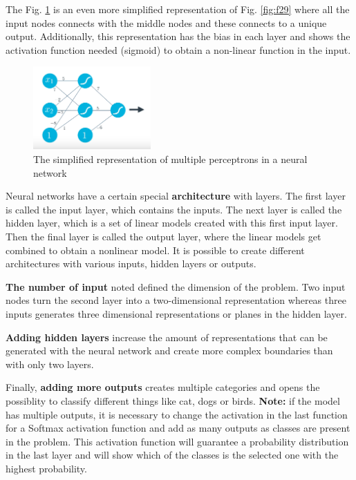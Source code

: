 \documentclass{article}
\begin{document}
The Fig. \ref{fig:f30} is an even more simplified representation of Fig. \ref{fig:f29} where all the input nodes connects with the middle nodes and these connects to a unique output. Additionally, this representation has the bias in each layer and shows the activation function needed (sigmoid) to obtain a non-linear function in the input.

\begin{figure}[ht]
    \centering
    \includegraphics[width=0.4\textwidth,height=0.4\textheight,keepaspectratio]{images/adding_perceptrons_3.png}
    \captionsetup{justification=centering}
    \caption{The simplified representation of multiple perceptrons in a neural network}
    \label{fig:f30}
\end{figure}

Neural networks have a certain special \textbf{architecture} with layers. The first layer is called the input layer, which contains the inputs. The next layer is called the hidden layer, which is a set of linear models created with this first input layer. Then the final layer is called the output layer, where the linear models get combined to obtain a nonlinear model. It is possible to create different architectures with various inputs, hidden layers or outputs. 

\textbf{The number of input} noted defined the dimension of the problem. Two input nodes turn the second layer into a two-dimensional representation whereas three inputs generates three dimensional representations or planes in the hidden layer. 

\textbf{Adding hidden layers} increase the amount of representations that can be generated with the neural network and create more complex boundaries than with only two layers. 

Finally, \textbf{adding more outputs} creates multiple categories and opens the possiblity to classify different things like cat, dogs or birds. \textbf{Note:} if the model has multiple outputs, it is necessary to change the activation in the last function for a Softmax activation function and add as many outputs as classes are present in the problem. This activation function will guarantee a probability distribution in the last layer and will show which of the classes is the selected one with the highest probability.
\end{document}
